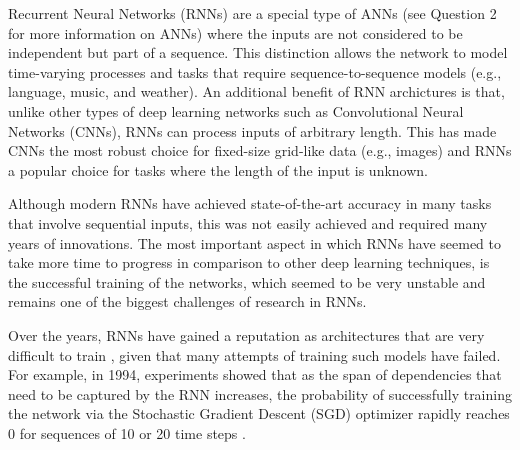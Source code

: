 





Recurrent Neural Networks (RNNs) are a special type of ANNs
(see Question 2 for more information on ANNs) where the
inputs are not considered to be independent but part of a
sequence. This distinction allows the network to model
time-varying processes and tasks that require
sequence-to-sequence models (e.g., language, music, and
weather). An additional benefit of RNN archictures is that,
unlike other types of deep learning networks such as
Convolutional Neural Networks (CNNs), RNNs can process
inputs of arbitrary length. This has made CNNs the most
robust choice for fixed-size grid-like data (e.g., images)
and RNNs a popular choice for tasks where the length of the
input is unknown.

Although modern RNNs have achieved state-of-the-art accuracy
in many tasks that involve sequential inputs, this was not
easily achieved and required many years of innovations. The
most important aspect in which RNNs have seemed to take more
time to progress in comparison to other deep learning
techniques, is the successful training of the networks,
which seemed to be very unstable and remains one of the
biggest challenges of research in RNNs.


Over the years, RNNs have gained a reputation as
architectures that are very difficult to train
\parencite{pascanu2013difficulty}, given that many attempts
of training such models have failed. For example, in 1994,
experiments showed that as the span of dependencies that
need to be captured by the RNN increases, the probability of
successfully training the network via the Stochastic
Gradient Descent (SGD) optimizer rapidly reaches 0 for
sequences of 10 or 20 time steps
\parencite{bengio1994learning}.


